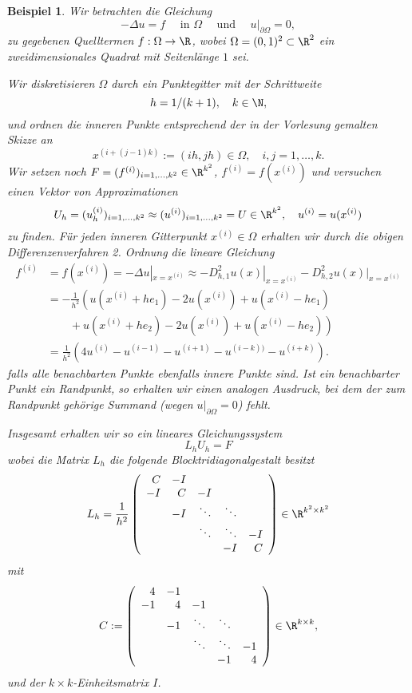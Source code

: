 \documentclass[
]{mycourse}
\theoremstyle{mythm}
\newtheorem{beispiel}[theorem]{Beispiel}
\theoremstyle{break}
\begin{document}
\begin{beispiel}\label{bsp:poisson}
Wir betrachten die Gleichung
\[
-\Delta u=f \quad \mbox{ in $\Omega$} \quad \mbox{ und } \quad u|_{\partial \Omega}=0,
\]
zu gegebenen Quelltermen $f:\Omega \to \R$, wobei $\Omega=(0,1)^2\subset \R^2$ ein zweidimensionales Quadrat mit Seitenlänge $1$ sei.

Wir diskretisieren $\Omega$ durch ein Punktegitter mit der Schrittweite 
 \[
h=1/(k+1),\quad k\in \N,
\]
und ordnen 
die inneren Punkte entsprechend der in der Vorlesung gemalten Skizze an
\[
x^{(i+(j-1)k)}:=(ih,jh)\in \Omega, \quad i,j=1,\ldots,k.
\]
Wir setzen noch $F=(f^{(i)})_{i=1,\ldots,k^2}\in \R^{k^2}$, $f^{(i)}=f(x^{(i)})$ und versuchen einen
Vektor von Approximationen 
\[
U_h=(u_h^{(i)})_{i=1,\ldots,k^2}\approx (u^{(i)})_{i=1,\ldots,k^2}=U \in \R^{k^2}, \quad u^{(i)}=u(x^{(i)})
\]
zu finden. Für jeden inneren Gitterpunkt $x^{(i)}\in \Omega$ erhalten wir durch die obigen Differenzenverfahren 2. Ordnung
die lineare Gleichung
\begin{align*}
f^{(i)}&=f(x^{(i)})=- \Delta u|_{x=x^{(i)}}\approx - D_{h,1}^2 u(x)|_{x=x^{(i)}} - D_{h,2}^2 u(x)|_{x=x^{(i)}}\\
&= -\frac{1}{h^2}\left( u(x^{(i)} + he_1)-2u(x^{(i)})+u(x^{(i)}-he_1) \right.\\
& \qquad \left. {} + u(x^{(i)} + he_2)-2u(x^{(i)})+u(x^{(i)}-he_2)\right)\\
&= \frac{1}{h^2} \left( 4 u^{(i)} - u^{(i-1)} - u^{(i+1)} -  u^{(i-k))} - u^{(i+k)} \right).
\end{align*}
falls alle benachbarten Punkte ebenfalls innere Punkte sind. Ist ein benachbarter Punkt ein Randpunkt, so erhalten
wir einen analogen Ausdruck, bei dem der zum Randpunkt gehörige Summand (wegen $u|_{\partial \Omega}=0$) fehlt.

Insgesamt erhalten wir so ein lineares Gleichungssystem
\[
L_h U_h = F
\]
wobei die Matrix $L_h$ die folgende Blocktridiagonalgestalt besitzt
\[
L_h=\frac{1}{h^2}\left( \begin{array}{r r r r r} C & -I\\ -I & C & -I\\ & -I & \ddots & \ddots\\ & & \ddots & \ddots & -I\\ & & & -I & C\end{array}\right)\in \R^{k^2\times k^2}
\]
mit
\[
C:=\left( \begin{array}{r r r r r} 4 & -1\\ -1 & 4 & -1\\ & -1 & \ddots & \ddots\\ & & \ddots & \ddots & -1\\ & & & -1 & 4\end{array}\right)\in \R^{k\times k},
\]
und der $k\times k$-Einheitsmatrix $I$.
\end{beispiel}
\end{document}
